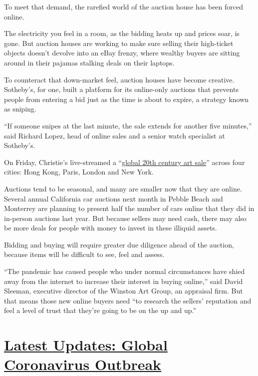 To meet that demand, the rarefied world of the auction house has been
forced online.

The electricity you feel in a room, as the bidding heats up and prices
soar, is gone. But auction houses are working to make sure selling their
high-ticket objects doesn't devolve into an eBay frenzy, where wealthy
buyers are sitting around in their pajamas stalking deals on their
laptops.

To counteract that down-market feel, auction houses have become
creative. Sotheby's, for one, built a platform for its online-only
auctions that prevents people from entering a bid just as the time is
about to expire, a strategy known as sniping.

``If someone snipes at the last minute, the sale extends for another
five minutes,'' said Richard Lopez, head of online sales and a senior
watch specialist at Sotheby's.

On Friday, Christie's live-streamed a
``\href{https://www.nytimes3xbfgragh.onion/2020/07/10/arts/design/christies-auction.html}{global
20th century art sale}'' across four cities: Hong Kong, Paris, London
and New York.

Auctions tend to be seasonal, and many are smaller now that they are
online. Several annual California car auctions next month in Pebble
Beach and Monterrey are planning to present half the number of cars
online that they did in in-person auctions last year. But because
sellers may need cash, there may also be more deals for people with
money to invest in these illiquid assets.

Bidding and buying will require greater due diligence ahead of the
auction, because items will be difficult to see, feel and assess.

``The pandemic has caused people who under normal circumstances have
shied away from the internet to increase their interest in buying
online,'' said David Sleeman, executive director of the Winston Art
Group, an appraisal firm. But that means those new online buyers need
``to research the sellers' reputation and feel a level of trust that
they're going to be on the up and up.''

\hypertarget{latest-updates-global-coronavirus-outbreak}{%
\section{\texorpdfstring{\href{https://www.nytimes3xbfgragh.onion/2020/08/03/world/coronavirus-covid-19.html?action=click\&pgtype=Article\&state=default\&region=MAIN_CONTENT_1\&context=storylines_live_updates}{Latest
Updates: Global Coronavirus
Outbreak}}{Latest Updates: Global Coronavirus Outbreak}}\label{latest-updates-global-coronavirus-outbreak}}

